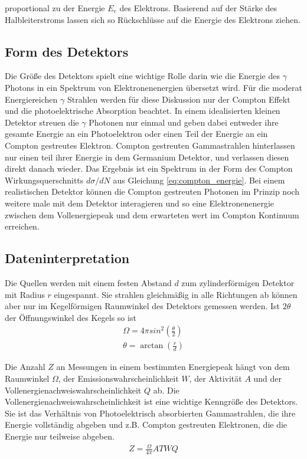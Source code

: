 proportional zu der Energie $E_e$ des Elektrons. Basierend auf der Stärke des
Halbleiterstroms lassen sich so Rückschlüsse auf die Energie des Elektrons
ziehen.

\subsection{Form des Detektors \cite[vgl][Kap. 2.4]{book:gil}}

Die Größe des Detektors spielt eine wichtige Rolle darin wie die Energie des
$\gamma$ Photons in ein Spektrum von Elektronenenergien übersetzt wird. Für die
moderat Energiereichen $\gamma$ Strahlen werden für diese Diskussion nur der
Compton Effekt und die photoelektrische Absorption beachtet. In einem
idealisierten kleinen Detektor streuen die $\gamma$ Photonen nur einmal und
geben dabei entweder ihre gesamte Energie an ein Photoelektron oder einen Teil
der Energie an ein Compton gestreutes Elektron. Compton gestreuten
Gammastrahlen hinterlassen nur einen teil ihrer Energie in dem Germanium
Detektor, und verlassen diesen direkt danach wieder. Das Ergebnis ist ein
Spektrum in der Form des Compton Wirkungsquerschnitts $d\sigma/dN$ aus
Gleichung \eqref{eq:compton_energie}. Bei einem realistischen Detektor können
die Compton gestreuten Photonen im Prinzip noch weitere male mit dem Detektor
interagieren und so eine Elektronenenergie zwischen dem Vollenergiepeak und dem
erwarteten wert im Compton Kontinuum erreichen.

\subsection{Dateninterpretation}

Die Quellen werden mit einem festen Abstand $d$ zum zylinderförmigen Detektor
mit Radius $r$ eingespannt. Sie strahlen gleichmäßig in alle Richtungen ab
können aber nur im Kegelförmigen Raumwinkel des Detektors gemessen werden. Ist
$2\theta$ der Öffnungswinkel des Kegels so ist \cite{wiki:raum}
\begin{align}
	\Omega = 4 \pi sin^2\left(\frac{\theta}{2}\right) \\
	\theta = \arctan \left(\frac{r}{d} \right)
\end{align}\label{eq:raumwinkel}

Die Anzahl $Z$ an Messungen in einem bestimmten Energiepeak hängt von dem
Raumwinkel $\Omega$, der Emissionswahrscheinlichkeit $W$, der Aktivität $A$ und
der Vollenergienachweiswahrscheinlichkeit $Q$ ab. Die
Vollenergienachweiswahrscheinlichkeit ist eine wichtige Kenngröße des
Detektors. Sie ist das Verhältnis von Photoelektrisch absorbierten
Gammastrahlen, die ihre Energie vollständig abgeben und z.B. Compton gestreuten
Elektronen, die die Energie nur teilweise abgeben.
\begin{align}
	Z = \frac{\Omega}{4\pi} A T W Q
	\label{eq:Q}
\end{align}

